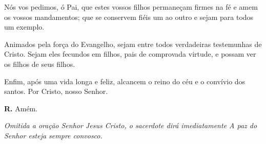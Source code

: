 \documentclass[a5paper,9pt]{memoir}
\begin{document}
{N\'os vos pedimos, \'o Pai, que estes vossos filhos permane\c cam firmes na f\'e e amem os vossos mandamentos; que se conservem fi\'eis um ao outro e sejam para todos um exemplo.

Animados pela for\c ca do Evangelho, sejam entre todos verdadeiras testemunhas de Cristo. Sejam eles fecundos em filhos, pais de comprovada virtude, e possam ver os filhos de seus filhos.

Enfim, ap\'os uma vida longa e feliz, alcancem o reino do c\'eu e o conv\'ivio dos santos. Por Cristo, nosso Senhor.

%
%
%
%
%
%

\textbf{R.} Amém.

{\itshape \color{mygray}Omitida a oração {\color{black}Senhor Jesus Cristo}, o sacerdote dir\'a imediatamente {\color{black}A paz do Senhor esteja sempre convosco}.}

}
\end{document}
